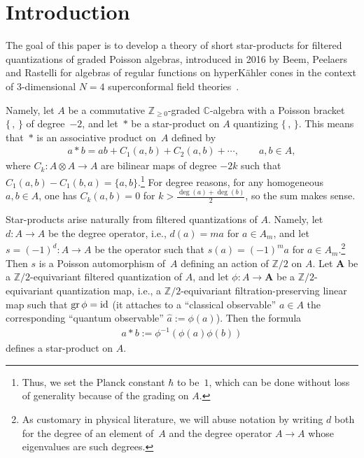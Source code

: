 \documentclass[pdftex]{sigma}
\numberwithin{equation}{section}
\begin{document}
\section{Introduction}

The goal of this paper is to develop a theory of short star-products for filtered quantizations of graded Poisson algebras, introduced in 2016 by Beem, Peelaers and Rastelli for algebras of regular functions on hyperK\"ahler cones in the context of 3-dimensional $N=4$ superconformal field theories~\cite{BPR}.

Namely, let $A$ be a commutative ${\mathbb Z}_{\ge 0}$-graded ${\mathbb C}$-algebra with a Poisson bracket $\lbrace\,,\,\rbrace$ of deg\-ree~$-2$, and let~$*$ be a star-product on $A$ quantizing $\lbrace\,,\,\rbrace$. This means that~$*$ is an associative product on~$A$ defined by
\begin{gather*}
a*b=ab+C_1(a,b)+C_2(a,b)+\cdots,\qquad a,b\in A,
\end{gather*}
where $C_k\colon A\otimes A\to A$ are bilinear maps of degree $-2k$ such that $C_1(a,b)-C_1(b,a)=\lbrace a,b\rbrace$.\footnote{Thus, we set the Planck constant $\hbar$ to be~$1$, which can be done without loss of generality because of the grading on $A$.} For degree reasons, for any homogeneous $a,b\in A$, one has $C_k(a,b)=0$ for $k>\frac{\deg(a)+\deg(b)}{2}$, so the sum makes sense.

Star-products arise naturally from filtered quantizations of $A$. Namely, let $d\colon A\to A$ be the degree operator, i.e., $d(a)=ma$ for $a\in A_m$, and let $s=(-1)^d\colon A\to A$ be the operator such that $s(a)=(-1)^ma$ for $a\in A_m$.\footnote{As customary in physical literature, we will abuse notation by writing $d$ both for the degree of an element of~$A$ and the degree operator $A\to A$ whose eigenvalues are such degrees.} Then $s$ is a Poisson automorphism of~$A$ defining an action of ${\mathbb Z}/2$ on $A$. Let ${{\mathbf A}}$ be a ${\mathbb Z}/2$-equivariant filtered quantization of $A$, and let $\phi\colon A\to {{\mathbf A}}$ be a ${\mathbb Z}/2$-equivariant quantization map, i.e., a ${\mathbb Z}/2$-equivariant filtration-preserving linear map such that $\operatorname{gr}\phi={\rm id}$ (it attaches to a ``classical observable'' $a\in A$ the corresponding ``quantum observable'' $\widehat{a}:=\phi(a)$). Then the formula
\begin{gather*}
a*b:=\phi^{-1}(\phi(a)\phi(b))
\end{gather*}
defines a star-product on $A$.
\end{document}
